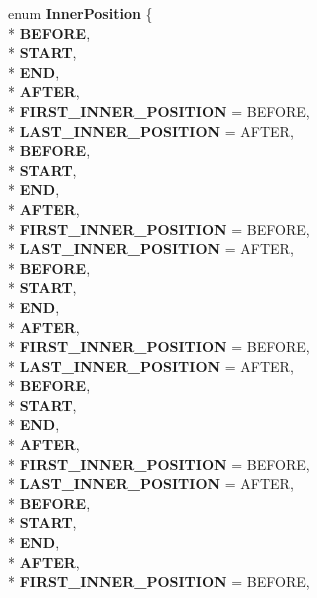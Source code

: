 \begin{DoxyCompactItemize}
\item 
enum {\bfseries Inner\+Position} \{ \\*
{\bfseries B\+E\+F\+O\+RE}, 
\\*
{\bfseries S\+T\+A\+RT}, 
\\*
{\bfseries E\+ND}, 
\\*
{\bfseries A\+F\+T\+ER}, 
\\*
{\bfseries F\+I\+R\+S\+T\+\_\+\+I\+N\+N\+E\+R\+\_\+\+P\+O\+S\+I\+T\+I\+ON} = B\+E\+F\+O\+RE, 
\\*
{\bfseries L\+A\+S\+T\+\_\+\+I\+N\+N\+E\+R\+\_\+\+P\+O\+S\+I\+T\+I\+ON} = A\+F\+T\+ER, 
\\*
{\bfseries B\+E\+F\+O\+RE}, 
\\*
{\bfseries S\+T\+A\+RT}, 
\\*
{\bfseries E\+ND}, 
\\*
{\bfseries A\+F\+T\+ER}, 
\\*
{\bfseries F\+I\+R\+S\+T\+\_\+\+I\+N\+N\+E\+R\+\_\+\+P\+O\+S\+I\+T\+I\+ON} = B\+E\+F\+O\+RE, 
\\*
{\bfseries L\+A\+S\+T\+\_\+\+I\+N\+N\+E\+R\+\_\+\+P\+O\+S\+I\+T\+I\+ON} = A\+F\+T\+ER, 
\\*
{\bfseries B\+E\+F\+O\+RE}, 
\\*
{\bfseries S\+T\+A\+RT}, 
\\*
{\bfseries E\+ND}, 
\\*
{\bfseries A\+F\+T\+ER}, 
\\*
{\bfseries F\+I\+R\+S\+T\+\_\+\+I\+N\+N\+E\+R\+\_\+\+P\+O\+S\+I\+T\+I\+ON} = B\+E\+F\+O\+RE, 
\\*
{\bfseries L\+A\+S\+T\+\_\+\+I\+N\+N\+E\+R\+\_\+\+P\+O\+S\+I\+T\+I\+ON} = A\+F\+T\+ER, 
\\*
{\bfseries B\+E\+F\+O\+RE}, 
\\*
{\bfseries S\+T\+A\+RT}, 
\\*
{\bfseries E\+ND}, 
\\*
{\bfseries A\+F\+T\+ER}, 
\\*
{\bfseries F\+I\+R\+S\+T\+\_\+\+I\+N\+N\+E\+R\+\_\+\+P\+O\+S\+I\+T\+I\+ON} = B\+E\+F\+O\+RE, 
\\*
{\bfseries L\+A\+S\+T\+\_\+\+I\+N\+N\+E\+R\+\_\+\+P\+O\+S\+I\+T\+I\+ON} = A\+F\+T\+ER, 
\\*
{\bfseries B\+E\+F\+O\+RE}, 
\\*
{\bfseries S\+T\+A\+RT}, 
\\*
{\bfseries E\+ND}, 
\\*
{\bfseries A\+F\+T\+ER}, 
\\*
{\bfseries F\+I\+R\+S\+T\+\_\+\+I\+N\+N\+E\+R\+\_\+\+P\+O\+S\+I\+T\+I\+ON} = B\+E\+F\+O\+RE, 

\end{DoxyCompactItemize}
